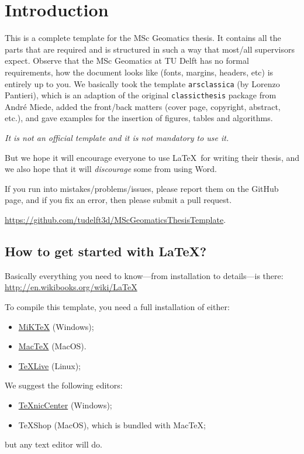 
\chapter{Introduction}
\label{chap:introduction}


This is a complete template for the MSc Geomatics thesis.
It contains all the parts that are required and is structured in such a way that most/all supervisors expect.
Observe that the MSc Geomatics at TU Delft has no formal requirements, how the document looks like (fonts, margins, headers, etc) is entirely up to you. 
We basically took the template \texttt{arsclassica} (by Lorenzo Pantieri), which is an adaption of the original \texttt{classicthesis} package from André Miede, added the front/back matters (cover page, copyright, abstract, etc.), and gave examples for the insertion of figures, tables and algorithms.

\emph{It is not an official template and it is not mandatory to use it.}

But we hope it will encourage everyone to use \LaTeX\ for writing their thesis, and we also hope that it will \emph{discourage} some from using Word.

If you run into mistakes/problems/issues, please report them on the GitHub page, and if you fix an error, then please submit a pull request. 

\url{https://github.com/tudelft3d/MScGeomaticsThesisTemplate}.


%
\section{How to get started with \LaTeX?}
\label{sec:startlatex}

Basically everything you need to know---from installation to details---is there:\\
\url{http://en.wikibooks.org/wiki/LaTeX}

To compile this template, you need a full installation of either:
\begin{itemize}
  \item \href{http://miktex.org/about}{MiKTeX} (Windows);
  \item \href{https://tug.org/mactex/}{MacTeX} (MacOS). 
  \item \href{https://www.tug.org/texlive/}{TeXLive} (Linux);
 \end{itemize} 

We suggest the following editors:
\begin{itemize}
  \item \href{http://www.texniccenter.org}{TeXnicCenter} (Windows);
  \item TeXShop (MacOS), which is bundled with MacTeX;
\end{itemize}
but any text editor will do.

